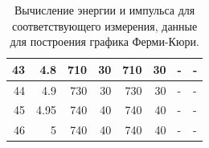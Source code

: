 \documentclass{article}
\begin{document}
\begin{table}[h!]
\begin{tabular}{|c|r|r|r|r|r|r|r|}
\multicolumn{1}{|r|}{43} & 4.8  & 710 & 30 & 710 & 30 & \multicolumn{1}{l|}{-} & \multicolumn{1}{l|}{-} \\ \hline
\multicolumn{1}{|r|}{44} & 4.9  & 730 & 30 & 730 & 30 & \multicolumn{1}{l|}{-} & \multicolumn{1}{l|}{-} \\ \hline
\multicolumn{1}{|r|}{45} & 4.95 & 740 & 40 & 740 & 40 & \multicolumn{1}{l|}{-} & \multicolumn{1}{l|}{-} \\ \hline
\multicolumn{1}{|r|}{46} & 5    & 740 & 40 & 740 & 40 & \multicolumn{1}{l|}{-} & \multicolumn{1}{l|}{-} \\ \hline
\end{tabular}
\caption{Вычисление энергии и импульса для соответствующего измерения, данные для построения графика Ферми-Кюри. }
\label{tab:my-table}
\end{table}
\end{document}
